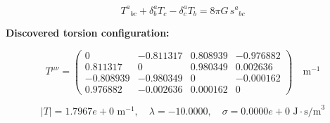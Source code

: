 
\begin{equation}
  T^a{}_{bc} + \delta^a_b T_c - \delta^a_c T_b = 8\pi G \, s^a{}_{bc}
\end{equation}

\textbf{Discovered torsion configuration:}

\begin{equation}
  T^{\mu\nu} = \begin{pmatrix}
    0 & -0.811317 & 0.808939 & -0.976882 \\
    0.811317 & 0 & 0.980349 & 0.002636 \\
    -0.808939 & -0.980349 & 0 & -0.000162 \\
    0.976882 & -0.002636 & 0.000162 & 0
  \end{pmatrix} \quad \text{m}^{-1}
\end{equation}

\begin{equation}
  |T| = 1.7967e+0 \text{ m}^{-1}, \quad
  \lambda = -10.0000, \quad
  \sigma = 0.0000e+0 \text{ J}\cdot\text{s/m}^3
\end{equation}